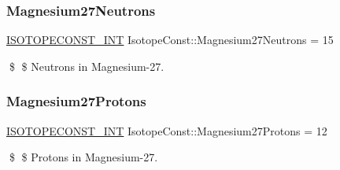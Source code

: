 \subsubsection{\texorpdfstring{Magnesium27\+Neutrons}{Magnesium27Neutrons}}
{\footnotesize\ttfamily \mbox{\hyperlink{group___isotope_const-_macros_ga5f18360b3e99483a35c32d789e62621c}{I\+S\+O\+T\+O\+P\+E\+C\+O\+N\+S\+T\+\_\+\+I\+NT}} Isotope\+Const\+::\+Magnesium27\+Neutrons = 15}

\$ \$ Neutrons in Magnesium-\/27. \mbox{\label{group___isotope_const-_magnesium-_mg27_ga57d7f07b7bc20cc215b6b57e3f0cfa2d}} 
\subsubsection{\texorpdfstring{Magnesium27\+Protons}{Magnesium27Protons}}
{\footnotesize\ttfamily \mbox{\hyperlink{group___isotope_const-_macros_ga5f18360b3e99483a35c32d789e62621c}{I\+S\+O\+T\+O\+P\+E\+C\+O\+N\+S\+T\+\_\+\+I\+NT}} Isotope\+Const\+::\+Magnesium27\+Protons = 12}

\$ \$ Protons in Magnesium-\/27. 